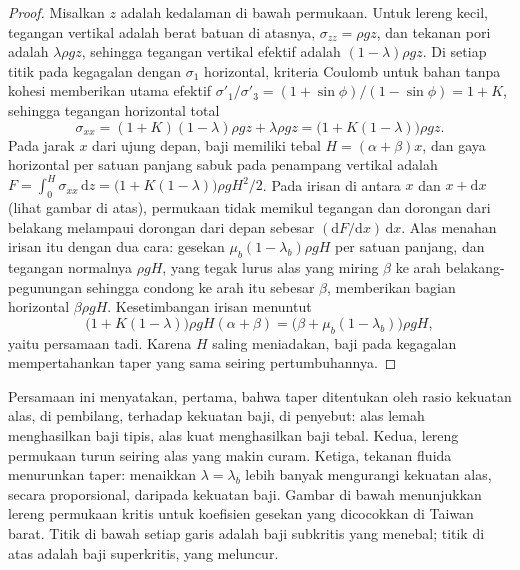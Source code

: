 \begin{proof}
Misalkan $z$ adalah kedalaman di bawah permukaan. Untuk lereng kecil, tegangan vertikal
adalah berat batuan di atasnya, $\sigma_{zz} = \rho g z$, dan tekanan pori
adalah $\lambda\rho g z$, sehingga tegangan vertikal efektif adalah
$(1 - \lambda)\rho g z$. Di setiap titik pada kegagalan dengan $\sigma_1$ horizontal,
kriteria Coulomb untuk bahan tanpa kohesi memberikan 
utama efektif $\sigma'_1/\sigma'_3 = (1 + \sin\phi)/(1 -
\sin\phi) = 1 + K$, sehingga tegangan horizontal total
\[
  \sigma_{xx} = (1 + K)(1 - \lambda)\rho g z + \lambda\rho g z
  = \bigl(1 + K(1 - \lambda)\bigr)\rho g z .
\]
Pada jarak $x$ dari ujung depan, baji memiliki tebal $H = (\alpha +
\beta)x$, dan gaya horizontal per satuan panjang sabuk pada penampang vertikal
adalah $F = \int_0^H \sigma_{xx}\,\mathrm dz = \bigl(1 + K(1 -
\lambda)\bigr)\rho g H^2/2$. Pada irisan di antara $x$ dan $x + \mathrm dx$
(lihat gambar di atas), permukaan tidak memikul tegangan dan dorongan dari belakang
melampaui dorongan dari depan sebesar $(\mathrm dF/\mathrm dx)\,\mathrm dx$.
Alas menahan irisan itu dengan dua cara: gesekan $\mu_b(1 -
\lambda_b)\rho g H$ per satuan panjang, dan tegangan normalnya $\rho g H$, yang
tegak lurus alas yang miring $\beta$ ke arah belakang-pegunungan sehingga
condong ke arah itu sebesar $\beta$, memberikan bagian horizontal $\beta\rho g H$.
Kesetimbangan irisan menuntut
\[
  \bigl(1 + K(1 - \lambda)\bigr)\rho g H(\alpha + \beta)
  = \bigl(\beta + \mu_b(1 - \lambda_b)\bigr)\rho g H ,
\]
yaitu persamaan tadi. Karena $H$ saling meniadakan, baji pada kegagalan
mempertahankan taper yang sama seiring pertumbuhannya.
\end{proof}

Persamaan ini menyatakan, pertama, bahwa taper ditentukan oleh rasio kekuatan
alas, di pembilang, terhadap kekuatan baji, di
penyebut: alas lemah menghasilkan baji tipis, alas kuat menghasilkan baji tebal.
Kedua, lereng permukaan turun seiring alas yang makin curam. Ketiga, tekanan fluida
menurunkan taper: menaikkan $\lambda = \lambda_b$ lebih banyak mengurangi
kekuatan alas, secara proporsional, daripada kekuatan
baji. Gambar di bawah menunjukkan lereng permukaan kritis untuk
koefisien gesekan yang dicocokkan di Taiwan barat. Titik di bawah setiap garis adalah baji subkritis
yang menebal; titik di atas adalah baji superkritis, yang meluncur.

